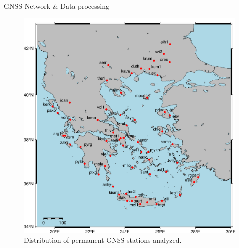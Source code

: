 \documentclass[final,a0,portrait]{beamer}
\newlength{\onecolwid}
\newlength{\twocolwid}
\newlength{\threecolwid}
\begin{document}
\begin{frame}[t]
\begin{columns}[t]
\begin{column}{\onecolwid}
\begin{block}{GNSS Network \& Data processing}
\begin{figure}
\begin{center}
  \includegraphics[width=.97\textwidth]{figures/gnss_network.png}
\end{center}
    \caption{Distribution of permanent GNSS stations analyzed.}
    \label{fig:proc-net}
\end{figure}      
\end{block}
\vfill
\begin{minipage}{\threecolwid}
  \begin{column}{\twocolwid}

\end{column}
\end{minipage}
\end{column}
\end{columns}
\end{frame}
\end{document}
